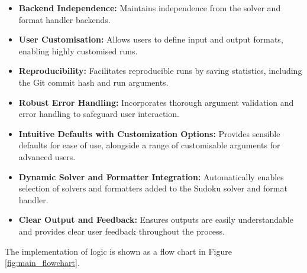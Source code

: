 \documentclass[11pt]{article}
\begin{document}
\begin{itemize}
    \item \textbf{Backend Independence:} Maintains independence from the solver and format handler backends.
    \item \textbf{User Customisation:} Allows users to define input and output formats, enabling highly customised runs.
    \item \textbf{Reproducibility:} Facilitates reproducible runs by saving statistics, including the Git commit hash and run arguments.
    \item \textbf{Robust Error Handling:} Incorporates thorough argument validation and error handling to safeguard user interaction.
    \item \textbf{Intuitive Defaults with Customization Options:} Provides sensible defaults for ease of use, alongside a range of customisable arguments for advanced users.
    \item \textbf{Dynamic Solver and Formatter Integration:} Automatically enables selection of solvers and formatters added to the Sudoku solver and format handler.
    \item \textbf{Clear Output and Feedback:} Ensures outputs are easily understandable and provides clear user feedback throughout the process.
\end{itemize}

The implementation of logic is shown as a flow chart in Figure \ref{fig:main_flowchart}.
\end{document}
